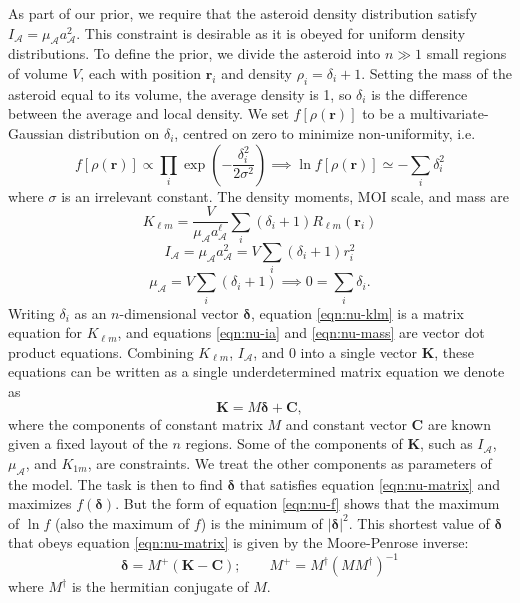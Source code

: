 \documentclass[fleqn,usenatbib]{mnras}
\newcommand{\parens}[1]{\left( #1 \right)}
\begin{document}
As part of our prior, we require that the asteroid density distribution satisfy $I_\mathcal{A} = \mu_\mathcal{A} a_\mathcal{A}^2$. This constraint is desirable as it is obeyed for uniform density distributions. To define the prior, we divide the asteroid into $n \gg 1$ small regions of volume $V$, each with position $\bm r_i$ and density $\rho_i = \delta_i + 1$. Setting the mass of the asteroid equal to its volume, the average density is 1, so $\delta_i$ is the difference between the average and local density. We set $f[\rho(\bm r)]$ to be a multivariate-Gaussian distribution on $\delta_i$, centred on zero to minimize non-uniformity, i.e.
\begin{equation}
  f[\rho(\bm r)] \propto \prod_i \exp\parens{-\frac{\delta_i^2}{2\sigma^2}} \implies \ln f[\rho(\bm r)] \simeq -\sum_i \delta_i^2
  \label{eqn:nu-f}
\end{equation}
where $\sigma$ is an irrelevant constant. The density moments, MOI scale, and mass are 
\begin{equation}
  K_{\ell m} = \frac{V}{\mu_\mathcal{A}a_\mathcal{A}^{\ell}} \sum_i (\delta_i + 1) R_{\ell m}(\bm r_i)
  \label{eqn:nu-klm}
\end{equation}
\begin{equation}
  I_\mathcal{A} = \mu_\mathcal{A} a_\mathcal{A}^2 = V \sum_i (\delta_i + 1) r_i^2
  \label{eqn:nu-ia}
\end{equation}
\begin{equation}
  \mu_\mathcal{A} = V\sum_i (\delta_i + 1) \implies 0 = \sum_i \delta_i.
  \label{eqn:nu-mass}
\end{equation}
Writing $\delta_i$ as an $n$-dimensional vector $\bm \delta$, equation \ref{eqn:nu-klm} is a matrix equation for $K_{\ell m}$, and equations \ref{eqn:nu-ia} and \ref{eqn:nu-mass} are vector dot product equations. Combining $K_{\ell m}$, $I_\mathcal{A}$, and $0$ into a single vector $\bm K$, these equations can be written as a single underdetermined matrix equation we denote as 
\begin{equation}
  \bm K = M \bm \delta + \bm C,
  \label{eqn:nu-matrix}
\end{equation}
where the components of constant matrix $M$ and constant vector $\bm C$ are known given a fixed layout of the $n$ regions. Some of the components of $\bm K$, such as $I_\mathcal{A}$, $\mu_\mathcal{A}$, and $K_{1m}$, are constraints. We treat the other components as parameters of the model. The task is then to find $\bm \delta$ that satisfies equation \ref{eqn:nu-matrix} and maximizes $f(\bm \delta)$. But the form of equation \ref{eqn:nu-f} shows that the maximum of $\ln f$ (also the maximum of $f$) is the minimum of $|\bm \delta|^2$. This shortest value of $\bm \delta$ that obeys equation \ref{eqn:nu-matrix} is given by the Moore-Penrose inverse:
\begin{equation}
  \bm \delta = M^+ (\bm K - \bm C); \qquad M^+ = M^\dagger(M M^\dagger)^{-1}
  \label{eqn:nu-delta}
\end{equation}
where $M^\dagger$ is the hermitian conjugate of $M$.
\end{document}
